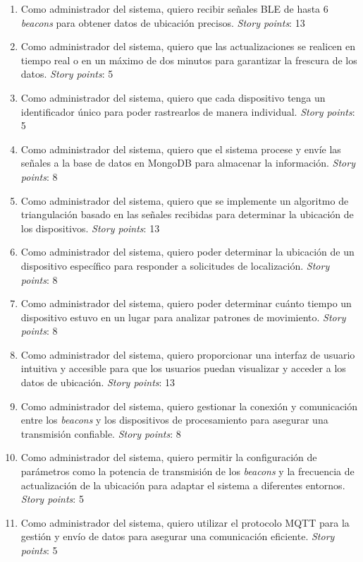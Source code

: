 \documentclass[
11pt, %
]{charter}
\begin{document}
\begin{enumerate}
	\item Como administrador del sistema, quiero recibir señales BLE de hasta 6 \textit{beacons} para obtener datos de ubicación precisos. \textit{Story points}: 13
	\item Como administrador del sistema, quiero que las actualizaciones se realicen en tiempo real o en un máximo de dos minutos para garantizar la frescura de los datos. \textit{Story points}: 5
	\item Como administrador del sistema, quiero que cada dispositivo tenga un identificador único para poder rastrearlos de manera individual. \textit{Story points}: 5
	\item Como administrador del sistema, quiero que el sistema procese y envíe las señales a la base de datos en MongoDB para almacenar la información. \textit{Story points}: 8
	\item Como administrador del sistema, quiero que se implemente un algoritmo de triangulación basado en las señales recibidas para determinar la ubicación de los dispositivos. \textit{Story points}: 13
	\item Como administrador del sistema, quiero poder determinar la ubicación de un dispositivo específico para responder a solicitudes de localización. \textit{Story points}: 8
	\item Como administrador del sistema, quiero poder determinar cuánto tiempo un dispositivo estuvo en un lugar para analizar patrones de movimiento. \textit{Story points}: 8
	\item Como administrador del sistema, quiero proporcionar una interfaz de usuario intuitiva y accesible para que los usuarios puedan visualizar y acceder a los datos de ubicación. \textit{Story points}: 13
	\item Como administrador del sistema, quiero gestionar la conexión y comunicación entre los \textit{beacons} y los dispositivos de procesamiento para asegurar una transmisión confiable. \textit{Story points}: 8
	\item Como administrador del sistema, quiero permitir la configuración de parámetros como la potencia de transmisión de los \textit{beacons} y la frecuencia de actualización de la ubicación para adaptar el sistema a diferentes entornos. \textit{Story points}: 5
	\item Como administrador del sistema, quiero utilizar el protocolo MQTT para la gestión y envío de datos para asegurar una comunicación eficiente. \textit{Story points}: 5

\end{enumerate}
\end{document}
